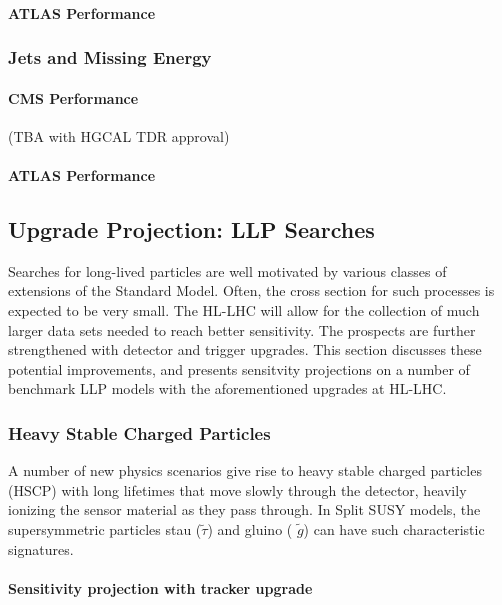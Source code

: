 \paragraph{ATLAS Performance}


\subsubsection{Jets and Missing Energy}

\paragraph{CMS Performance} 

(TBA with HGCAL TDR approval) 

\paragraph{ATLAS Performance}



\subsection{Upgrade Projection: LLP Searches} \label{sec:upgradesearch}

Searches for long-lived particles are well motivated by various classes of extensions of the Standard Model. 
Often, the cross section for such processes is expected to be very small. The HL-LHC will allow for the collection of much larger data sets needed to reach better sensitivity. 
The prospects are further strengthened with detector and trigger upgrades. 
This section discusses these potential improvements, and presents sensitvity projections on a number of benchmark LLP models with the aforementioned upgrades at HL-LHC. 

\subsubsection{Heavy Stable Charged Particles}

A number of new physics scenarios give rise to heavy stable charged particles (HSCP) with long lifetimes that move slowly through the detector, heavily
ionizing the sensor material as they pass through. 
In Split SUSY models, the supersymmetric particles stau ($\tilde{\tau}$) and gluino ( $\tilde{g}$) can have such characteristic signatures.

\paragraph{Sensitivity projection with tracker upgrade} 

